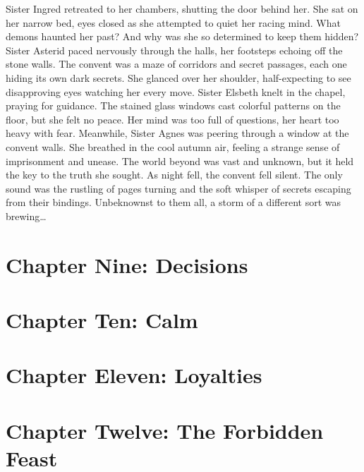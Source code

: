 \documentclass[11pt]{article}
\begin{document}
Sister Ingred retreated to her chambers, shutting the door behind her. She sat on her narrow bed, eyes closed as she attempted to quiet her racing mind. What demons haunted her past? And why was she so determined to keep them hidden?
Sister Asterid paced nervously through the halls, her footsteps echoing off the stone walls. The convent was a maze of corridors and secret passages, each one hiding its own dark secrets. She glanced over her shoulder, half-expecting to see disapproving eyes watching her every move.
Sister Elsbeth knelt in the chapel, praying for guidance. The stained glass windows cast colorful patterns on the floor, but she felt no peace. Her mind was too full of questions, her heart too heavy with fear.
Meanwhile, Sister Agnes was peering through a window at the convent walls. She breathed in the cool autumn air, feeling a strange sense of imprisonment and unease. The world beyond was vast and unknown, but it held the key to the truth she sought.
As night fell, the convent fell silent. The only sound was the rustling of pages turning and the soft whisper of secrets escaping from their bindings. Unbeknownst to them all, a storm of a different sort was brewing\ldots{}

\section{Chapter Nine: Decisions}
\label{sec:orgcab588c}
\section{Chapter Ten: Calm}
\label{sec:orgc3b4438}
\section{Chapter Eleven: Loyalties}
\label{sec:org6db439e}
\section{Chapter Twelve: The Forbidden Feast}
\label{sec:org3d01d69}
\end{document}
